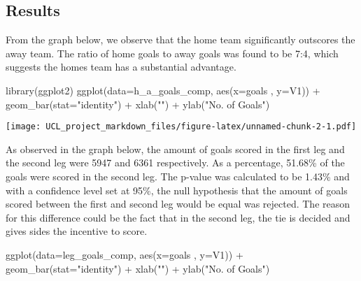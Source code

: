 \documentclass[
]{article}
\newenvironment{Shaded}{\begin{snugshade}}{\end{snugshade}}
\newcommand{\AttributeTok}[1]{\textcolor[rgb]{0.77,0.63,0.00}{#1}}
\newcommand{\FunctionTok}[1]{\textcolor[rgb]{0.00,0.00,0.00}{#1}}
\newcommand{\NormalTok}[1]{#1}
\newcommand{\SpecialCharTok}[1]{\textcolor[rgb]{0.00,0.00,0.00}{#1}}
\newcommand{\StringTok}[1]{\textcolor[rgb]{0.31,0.60,0.02}{#1}}
\begin{document}
\hypertarget{results}{%
\subsection{Results}\label{results}}

From the graph below, we observe that the home team significantly
outscores the away team. The ratio of home goals to away goals was found
to be 7:4, which suggests the homes team has a substantial advantage.

\begin{Shaded}
\begin{Highlighting}[]
\FunctionTok{library}\NormalTok{(ggplot2)}
\FunctionTok{ggplot}\NormalTok{(}\AttributeTok{data=}\NormalTok{h\_a\_goals\_comp, }\FunctionTok{aes}\NormalTok{(}\AttributeTok{x=}\NormalTok{goals , }\AttributeTok{y=}\NormalTok{V1)) }\SpecialCharTok{+}
  \FunctionTok{geom\_bar}\NormalTok{(}\AttributeTok{stat=}\StringTok{"identity"}\NormalTok{) }\SpecialCharTok{+}
  \FunctionTok{xlab}\NormalTok{(}\StringTok{""}\NormalTok{) }\SpecialCharTok{+} \FunctionTok{ylab}\NormalTok{(}\StringTok{"No. of Goals"}\NormalTok{)}
\end{Highlighting}
\end{Shaded}

\texttt{[image: UCL\_project\_markdown\_files/figure-latex/unnamed-chunk-2-1.pdf]}

As observed in the graph below, the amount of goals scored in the first
leg and the second leg were 5947 and 6361 respectively. As a percentage,
51.68\% of the goals were scored in the second leg. The p-value was
calculated to be 1.43\% and with a confidence level set at 95\%, the
null hypothesis that the amount of goals scored between the first and
second leg would be equal was rejected. The reason for this difference
could be the fact that in the second leg, the tie is decided and gives
sides the incentive to score.

\begin{Shaded}
\begin{Highlighting}[]
\FunctionTok{ggplot}\NormalTok{(}\AttributeTok{data=}\NormalTok{leg\_goals\_comp, }\FunctionTok{aes}\NormalTok{(}\AttributeTok{x=}\NormalTok{goals , }\AttributeTok{y=}\NormalTok{V1)) }\SpecialCharTok{+}
  \FunctionTok{geom\_bar}\NormalTok{(}\AttributeTok{stat=}\StringTok{"identity"}\NormalTok{) }\SpecialCharTok{+}
  \FunctionTok{xlab}\NormalTok{(}\StringTok{""}\NormalTok{) }\SpecialCharTok{+} \FunctionTok{ylab}\NormalTok{(}\StringTok{"No. of Goals"}\NormalTok{)}
\end{Highlighting}
\end{Shaded}
\end{document}
